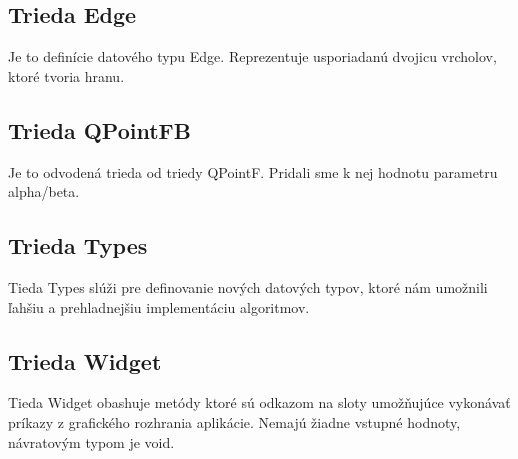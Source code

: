 \documentclass[12pt]{article}
\begin{document}
\subsection{Trieda Edge}
Je to definície datového typu Edge. Reprezentuje usporiadanú dvojicu vrcholov, ktoré tvoria hranu.

\subsection{Trieda QPointFB}
Je to odvodená trieda od triedy QPointF. Pridali sme k nej hodnotu parametru alpha/beta. 

\subsection{Trieda Types}
Tieda Types slúži pre definovanie nových datových typov, ktoré nám umožnili ľahšiu a prehladnejšiu implementáciu algoritmov.

\subsection{Trieda Widget}
Tieda Widget obashuje metódy ktoré sú odkazom na sloty umožňujúce vykonávať príkazy z grafického rozhrania aplikácie. Nemajú žiadne vstupné hodnoty, návratovým typom je void.
\end{document}
